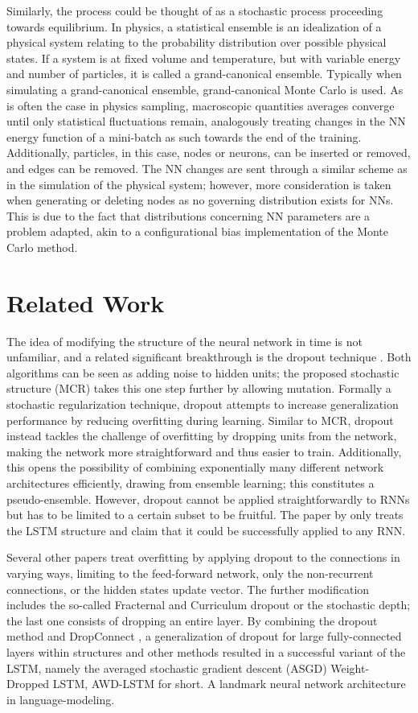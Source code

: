Similarly, the process could be thought of as a stochastic process proceeding towards equilibrium. In physics, a statistical ensemble is an idealization of a physical system relating to the probability distribution over possible physical states. If a system is at fixed volume and temperature, but with variable energy and number of particles, it is called a grand-canonical ensemble. Typically when simulating a grand-canonical ensemble, grand-canonical Monte Carlo is used. As is often the case in physics sampling, macroscopic quantities averages converge until only statistical fluctuations remain, analogously treating changes in the NN energy function of a mini-batch as such towards the end of the training. Additionally, particles, in this case, nodes or neurons, can be inserted or removed, and edges can be removed. The NN changes are sent through a similar scheme as in the simulation of the physical system; however, more consideration is taken when generating or deleting nodes as no governing distribution exists for NNs. This is due to the fact that distributions concerning NN parameters are a problem adapted, akin to a configurational bias implementation of the Monte Carlo method. 

\section{Related Work}

The idea of modifying the structure of the neural network in time is not unfamiliar, and a related significant breakthrough is the dropout technique \cite{drop}. Both algorithms can be seen as adding noise to hidden units; the proposed stochastic structure (MCR) takes this one step further by allowing mutation. Formally a stochastic regularization technique, dropout attempts to increase generalization performance by reducing overfitting during learning. Similar to MCR, dropout instead tackles the challenge of overfitting by dropping units from the network, making the network more straightforward and thus easier to train. Additionally, this opens the possibility of combining exponentially many different network architectures efficiently, drawing from ensemble learning; this constitutes a pseudo-ensemble. However, dropout cannot be applied straightforwardly to RNNs \cite{dropno} but has to be limited to a certain subset\cite{droprnn} to be fruitful. The paper by \textcite{droprnn} only treats the LSTM structure and claim that it could be successfully applied to any RNN. 

Several other papers treat overfitting by applying dropout to the connections in varying ways, limiting to the feed-forward network, only the non-recurrent connections, or the hidden states update vector. The further modification includes the so-called Fracternal and Curriculum dropout or the stochastic depth; the last one consists of dropping an entire layer\cite{stochdep}. By combining the dropout method and DropConnect \cite{DropConnect}, a generalization of dropout for large fully-connected layers within structures and other methods resulted in a successful variant of the LSTM, namely the averaged stochastic gradient descent (ASGD) Weight-Dropped LSTM, AWD-LSTM for short. A landmark neural network architecture in language-modeling. 

